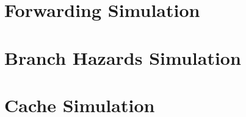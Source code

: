 \documentclass[11pt,a4paper,titlepage,oneside]{article}
\begin{document}
\maketitle

\section*{Forwarding Simulation}

\clearpage
\section*{Branch Hazards Simulation}

\clearpage
\section*{Cache Simulation}

\end{document}

